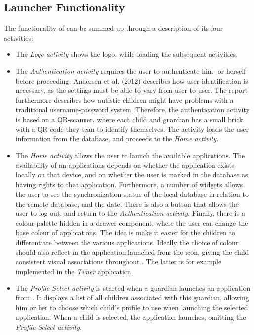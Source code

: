 \subsection{Launcher Functionality}
The functionality of \launcher can be summed up through a description of its four activities:
\begin{itemize}
	\item The \textit{Logo activity} shows the \giraf logo, while loading the subsequent activities.
	\item The \textit{Authentication activity} requires the user to authenticate him- or herself before proceeding. 
	Andersen et al. (2012) describes how user identification is necessary, as the \giraf settings must be able to vary from user to user. 
	The report furthermore describes how autistic children might have problems with a traditional username-password system. 
	Therefore, the authentication activity is based on a QR-scanner, where each child and guardian has a small brick with a QR-code they scan to identify 		  	themselves. 
	The activity loads the user information from the database, and proceeds to the \textit{Home activity}.
	\item The \textit{Home activity} allows the user to launch the available \giraf applications. 
	The availability of an applications depends on whether the application exists locally on that device, and on whether the user is marked in the database as 	having rights to that application. 
	Furthermore, a number of widgets allows the user to see the synchronization status of the local database in relation to the remote database, and the 	 	date. 
	There is also a button that allows the user to log out, and return to the \textit{Authentication activity}. 
	Finally, there is a colour palette hidden in a drawer component, where the user can change the base colour of applications. 
	The idea is make it easier for the children to differentiate between the various applications. 
	Ideally the choice of colour should also reflect in the application launched from the icon, giving the child consistent visual associations throughout \giraf.
	The latter is for example implemented in the \textit{Timer} application.
	\item The \textit{Profile Select activity} is started when a guardian launches an application from \launcher. 
	It displays a list of all children associated with this guardian, allowing him or her to choose which child's profile to use when launching the selected application. 
	When a child is selected, the application launches, omitting the \textit{Profile Select activity}.
\end{itemize}


